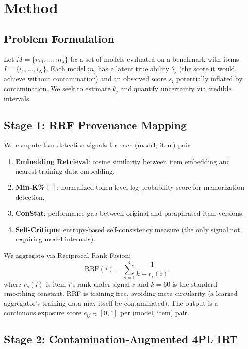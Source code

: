 \documentclass[letterpaper,11pt]{article}
\begin{document}
\section{Method}

\subsection{Problem Formulation}

Let $M = \{m_1, \ldots, m_J\}$ be a set of models evaluated on a benchmark with items $I = \{i_1, \ldots, i_N\}$. Each model $m_j$ has a latent true ability $\theta_j$ (the score it would achieve without contamination) and an observed score $s_j$ potentially inflated by contamination. We seek to estimate $\theta_j$ and quantify uncertainty via credible intervals.

\subsection{Stage 1: RRF Provenance Mapping}

We compute four detection signals for each (model, item) pair:

\begin{enumerate}
    \item \textbf{Embedding Retrieval}: cosine similarity between item embedding and nearest training data embedding.
    \item \textbf{Min-K\%++}: normalized token-level log-probability score for memorization detection.
    \item \textbf{ConStat}: performance gap between original and paraphrased item versions.
    \item \textbf{Self-Critique}: entropy-based self-consistency measure (the only signal not requiring model internals).
\end{enumerate}

We aggregate via Reciprocal Rank Fusion:
\begin{equation}
    \text{RRF}(i) = \sum_{s=1}^{4} \frac{1}{k + r_s(i)}
\end{equation}
where $r_s(i)$ is item $i$'s rank under signal $s$ and $k=60$ is the standard smoothing constant. RRF is training-free, avoiding meta-circularity (a learned aggregator's training data may itself be contaminated). The output is a continuous exposure score $e_{ij} \in [0,1]$ per (model, item) pair.

\subsection{Stage 2: Contamination-Augmented 4PL IRT}
\end{document}
